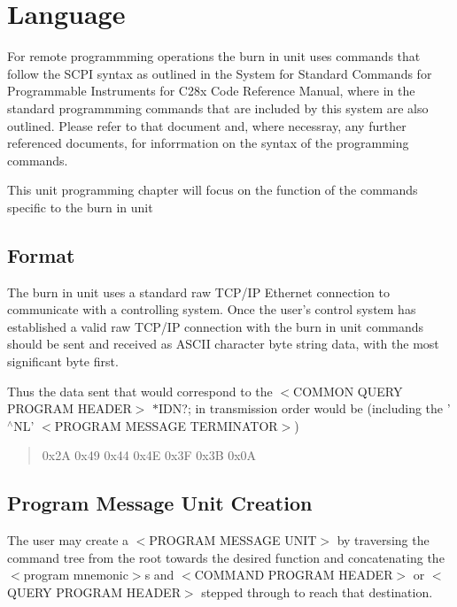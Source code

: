 \hypertarget{a00002_lang}{}\section{Language}\label{a00002_lang}
For remote programmming operations the burn in unit uses commands that follow the S\-C\-P\-I syntax as outlined in the System for Standard Commands for Programmable Instruments for C28x Code Reference Manual, where in the standard programmming commands that are included by this system are also outlined. Please refer to that document and, where necessray, any further referenced documents, for inforrmation on the syntax of the programming commands.

This unit programming chapter will focus on the function of the commands specific to the burn in unit\hypertarget{a00002_format}{}\subsection{Format}\label{a00002_format}
The burn in unit uses a standard raw T\-C\-P/\-I\-P Ethernet connection to communicate with a controlling system. Once the user's control system has established a valid raw T\-C\-P/\-I\-P connection with the burn in unit commands should be sent and received as A\-S\-C\-I\-I character byte string data, with the most significant byte first.

Thus the data sent that would correspond to the {\ttfamily $<$}C\-O\-M\-M\-O\-N Q\-U\-E\-R\-Y P\-R\-O\-G\-R\-A\-M H\-E\-A\-D\-E\-R{\ttfamily $>$} {\ttfamily $\ast$\-I\-D\-N}?; in transmission order would be (including the '$^\wedge$\-N\-L' {\ttfamily $<$}P\-R\-O\-G\-R\-A\-M M\-E\-S\-S\-A\-G\-E T\-E\-R\-M\-I\-N\-A\-T\-O\-R{\ttfamily $>$}) \begin{quotation}
{\ttfamily 0x2\-A 0x49 0x44 0x4\-E 0x3\-F 0x3\-B 0x0\-A}

\end{quotation}
\hypertarget{a00002_progcreation}{}\subsection{Program Message Unit Creation}\label{a00002_progcreation}
The user may create a {\ttfamily $<$}P\-R\-O\-G\-R\-A\-M M\-E\-S\-S\-A\-G\-E U\-N\-I\-T{\ttfamily $>$} by traversing the command tree from the root towards the desired function and concatenating the {\ttfamily $<$}program mnemonic{\ttfamily $>$}s and {\ttfamily $<$}C\-O\-M\-M\-A\-N\-D P\-R\-O\-G\-R\-A\-M H\-E\-A\-D\-E\-R{\ttfamily $>$} or {\ttfamily $<$}Q\-U\-E\-R\-Y P\-R\-O\-G\-R\-A\-M H\-E\-A\-D\-E\-R{\ttfamily $>$} stepped through to reach that destination.

